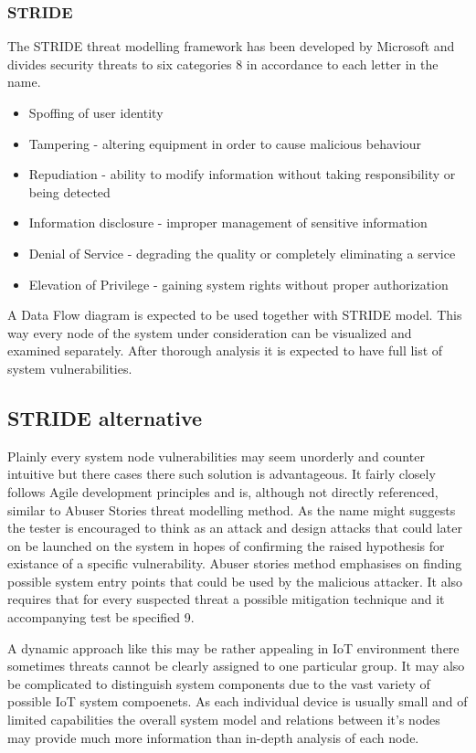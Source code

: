 \subsubsection{STRIDE}
The STRIDE threat modelling framework has been developed by Microsoft and divides security threats to six categories {8} in accordance to each letter in the name.
\begin {itemize}
\item Spoffing of user identity
\item Tampering - altering equipment in order to cause malicious behaviour
\item Repudiation - ability to modify information without taking responsibility or being detected
\item Information disclosure - improper management of sensitive information
\item Denial of Service - degrading the quality or completely eliminating a service
\item Elevation of Privilege - gaining system rights without proper authorization
\end{itemize}

A Data Flow diagram is expected to be used together with STRIDE model. This way every node of the system under consideration can be visualized and examined separately. After thorough analysis it is expected to have full list of system vulnerabilities.

\subsection{STRIDE alternative}
Plainly every system node vulnerabilities may seem unorderly and counter intuitive but there cases there such solution is advantageous. It fairly closely follows Agile development principles and is, although not directly referenced, similar to Abuser Stories threat modelling method. As the name might suggests the tester is encouraged to think as an attack and design attacks that could later on be launched on the system in hopes of confirming the raised hypothesis for existance of a specific vulnerability. Abuser stories method emphasises on finding possible system entry points that could be used by the malicious attacker. It also requires that for every suspected threat a possible mitigation technique and it accompanying test be specified {9}.

A dynamic approach like this may be rather appealing in IoT environment there sometimes threats cannot be clearly assigned to one particular group. It may also be complicated to distinguish system components due to the vast variety of possible IoT system compoenets. As each individual device is usually small and of limited capabilities the overall system model and relations between it's nodes may provide much more information than in-depth analysis of each node.

